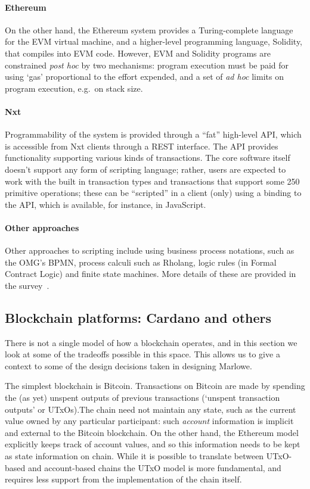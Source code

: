 \documentclass[
      acmsmall
    , screen
    , review=true
  ]{acmart}
\begin{document}
\paragraph{Ethereum}

On the other hand, the Ethereum system provides a Turing-complete language for the EVM virtual machine, and a higher-level programming language, Solidity, that compiles into EVM code. However, EVM and Solidity programs are constrained \emph{post hoc} by two mechanisms: program execution must be paid for using `gas' proportional to the effort expended, and a set of \emph{ad hoc} limits on program execution, e.g.\ on stack size.

\paragraph{Nxt}

Programmability of the system is provided through a ``fat'' high-level API, which is accessible from Nxt clients through a REST interface. The API provides functionality supporting various kinds of transactions. The core software itself doesn't support any form of scripting language; rather, users are expected to work with the built in transaction types and transactions that support some 250 primitive operations; these can be ``scripted'' in a client (only) using a binding to the API, which is available, for instance, in JavaScript.

\paragraph{Other approaches}

Other approaches to scripting include using business process notations, such as the OMG's BPMN, process calculi such as Rholang, logic rules (in Formal Contract Logic) and finite state machines. More details of these are provided in the survey~\cite{cryptoeprint:2016:1156}.

\subsection{Blockchain platforms: Cardano and others}

There is not a single model of how a blockchain operates, and in this section we look at some of the tradeoffs possible in this space. This allows us to give a context to some of the design decisions taken in designing Marlowe.  

The simplest blockchain is Bitcoin. Transactions on Bitcoin are made by spending the (as yet) unspent outputs of previous transactions (`unspent transaction outputs' or UTxOs).The chain need not maintain any state, such as the current value owned by any particular participant: such \emph{account} information is implicit and external to the Bitcoin blockchain. On the other hand, the Ethereum model explicitly keeps track of account values, and so this information needs to be kept as state information on chain. While it is possible to translate between UTxO-based and account-based chains  the UTxO model is more fundamental, and requires less support from the implementation of the chain itself.
\end{document}
